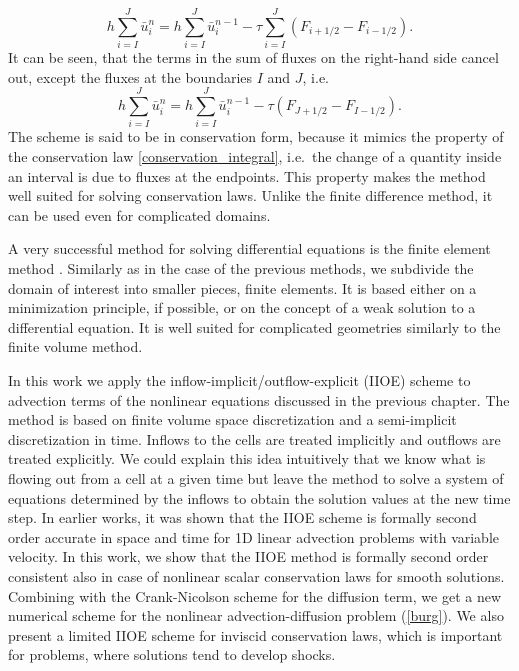 \documentclass[../include.tex]{subfiles}
\begin{document}
\[
h \sum_{i=I}^{J} \bar{u}_i^{n} = h \sum_{i=I}^{J} \bar{u}_i^{n-1} - \tau\sum_{i=I}^{J}\left(F_{i+1/2} - F_{i-1/2}\right).
\]
It can be seen, that the terms in the sum of fluxes on the right-hand side cancel out, except the fluxes at the boundaries $ I $ and $ J $, i.e.\
\[
h \sum_{i=I}^{J} \bar{u}_i^{n} = h \sum_{i=I}^{J} \bar{u}_i^{n-1} - \tau\left(F_{J+1/2} - F_{I-1/2}\right).
\]
The scheme is said to be in conservation form, because it mimics the property of the conservation law \eqref{conservation_integral}, i.e.\ the change of a quantity inside an interval is due to fluxes at the endpoints. This property makes the method well suited for solving conservation laws. Unlike the finite difference method, it can be used even for complicated domains.

A very successful method for solving differential equations is the finite element method \cite{reddy, olv}. Similarly as in the case of the previous methods, we subdivide the domain of interest into smaller pieces, finite elements. It is based either on a minimization principle, if possible, or on the concept of a weak solution to a differential equation. It is well suited for complicated geometries similarly to the finite volume method.

In this work we apply the inflow-implicit\slash outflow-explicit (IIOE) scheme to advection terms of the nonlinear equations discussed in the previous chapter. The method is based on finite volume space discretization and a semi-implicit discretization in time. Inflows to the cells are treated implicitly and outflows are treated explicitly. We could explain this idea intuitively that we know what is flowing out from a cell at a given time but leave the method to solve a system of equations determined by the inflows to obtain the solution values at the new time step. In earlier works, \cite{iioe2012, iioe2} it was shown that the IIOE scheme is formally second order accurate in space and time for 1D linear advection problems with variable velocity. In this work, we show that the IIOE method is formally second order consistent also in case of nonlinear scalar conservation laws for smooth solutions. Combining with the Crank-Nicolson scheme for the diffusion term, we get a new numerical scheme for the nonlinear advection-diffusion problem (\ref{burg}). We also present a limited IIOE scheme for inviscid conservation laws, which is important for problems, where solutions tend to develop shocks.
\end{document}
